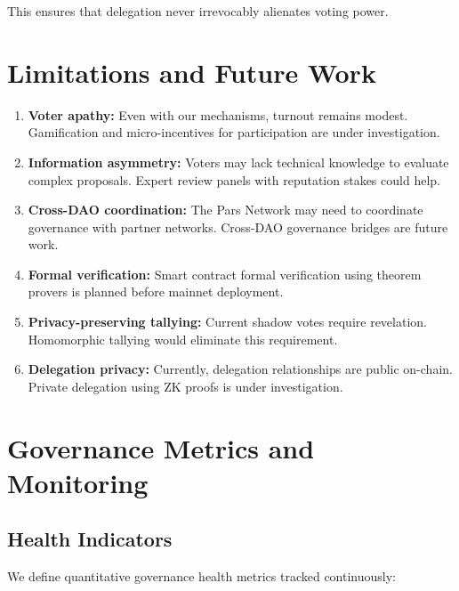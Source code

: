 \documentclass[11pt,a4paper]{article}
\begin{document}
This ensures that delegation never irrevocably alienates voting power.

\section{Limitations and Future Work}

\begin{enumerate}
    \item \textbf{Voter apathy:} Even with our mechanisms, turnout remains modest. Gamification and micro-incentives for participation are under investigation.
    \item \textbf{Information asymmetry:} Voters may lack technical knowledge to evaluate complex proposals. Expert review panels with reputation stakes could help.
    \item \textbf{Cross-DAO coordination:} The Pars Network may need to coordinate governance with partner networks. Cross-DAO governance bridges are future work.
    \item \textbf{Formal verification:} Smart contract formal verification using theorem provers is planned before mainnet deployment.
    \item \textbf{Privacy-preserving tallying:} Current shadow votes require revelation. Homomorphic tallying would eliminate this requirement.
    \item \textbf{Delegation privacy:} Currently, delegation relationships are public on-chain. Private delegation using ZK proofs is under investigation.
\end{enumerate}

\section{Governance Metrics and Monitoring}

\subsection{Health Indicators}

We define quantitative governance health metrics tracked continuously:
\end{document}
